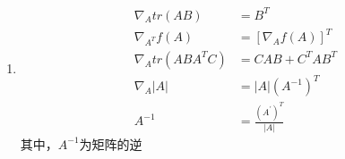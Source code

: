 \begin{enumerate}
	\item 
	\begin{align}
		\nabla_Atr(AB) &= B^T \\
		\nabla_{A^T}f(A) &= \left[\nabla_Af(A)\right]^T \\
		\nabla_Atr(ABA^TC) &= CAB + C^TAB^T \\
		\nabla_A|A| &= |A|(A^{-1})^T \\
		A^{-1} &= \frac{(A^{'})^T}{|A|}
	\end{align}
	其中，$A^{-1}$为矩阵的逆



\end{enumerate}


















